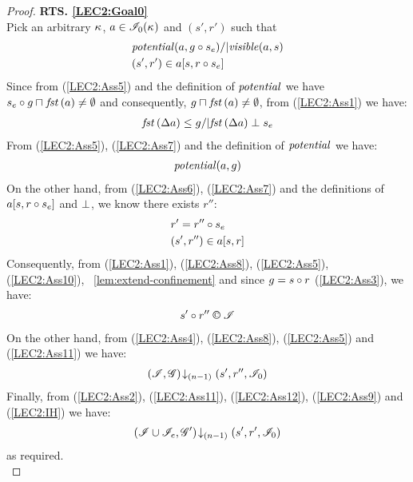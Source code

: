 \begin{lemma}
\begin{proof}
\noindent\textbf{RTS. \ref{LEC2:Goal0}}\\
Pick an arbitrary $\kappa_{}$, $a \in \mathscr{I}_0(\kappa_{})$ and $(s', r')$ such that
%
\begin{align}
	& \mathit{potential}(a, g \circ s_e) /| \mathit{visible}(a, s) \label{LEC2:Ass5}\\
	& (s', r') \in a[s, r \circ s_e] \label{LEC2:Ass6}
\end{align}
Since from (\ref{LEC2:Ass5}) and the definition of $\mathit{potential}$ we have $s_e \circ g \sqcap_{} \mathit{fst}\left(a\right) \not= \emptyset$ and consequently, $g \sqcap_{} \mathit{fst}\left(a\right) \not= \emptyset$, from (\ref{LEC2:Ass1}) we have:
%
\begin{align}
	\mathit{fst}\left(\Delta {a}\right) \leq g /| \mathit{fst}\left(\Delta {a}\right) \mathrel{\bot} s_e \label{LEC2:Ass7}
\end{align}
% 
From (\ref{LEC2:Ass5}), (\ref{LEC2:Ass7}) and the definition of $\mathit{potential}$ we have:
%
\begin{align}
	\mathit{potential}(a, g) \label{LEC2:Ass8}
\end{align}
%
On the other hand, from (\ref{LEC2:Ass6}), (\ref{LEC2:Ass7}) and the definitions of $a[s, r \circ s_e]$ and $\mathrel{\bot}$, we know there exists $r''$: 
%
\begin{align}
	& r' = r'' \circ s_e \label{LEC2:Ass9}\\
	& (s', r'') \in a[s, r]  \label{LEC2:Ass10}
\end{align}
%
Consequently, from (\ref{LEC2:Ass1}), (\ref{LEC2:Ass8}), (\ref{LEC2:Ass5}), (\ref{LEC2:Ass10}), \lem~\ref{lem:extend-confinement} and since $g = s \circ r$ (\ref{LEC2:Ass3}), we have:
%
\begin{align}
	s' \composeL r'' \confines \lmod  \label{LEC2:Ass11}
\end{align}
On the other hand, from (\ref{LEC2:Ass4}), (\ref{LEC2:Ass8}), (\ref{LEC2:Ass5}) and (\ref{LEC2:Ass11}) we have:
%
\begin{align}
	\left(\mathscr{I}, \mathscr{G}\right) \!\downarrow_{(n-1)} \left(s', r'', \mathscr{I}_0\right) \label{LEC2:Ass12}
\end{align}
%
Finally, from (\ref{LEC2:Ass2}), (\ref{LEC2:Ass11}), (\ref{LEC2:Ass12}), (\ref{LEC2:Ass9}) and (\ref{LEC2:IH}) we have:
%
\begin{align*}
	\left(\mathscr{I} \cup \mathscr{I}_{e}, \mathscr{G}'\right) \!\downarrow_{(n-1)} \left(s', r', \mathscr{I}_0\right)
\end{align*}
%
as required.\\
%
%
%


\end{proof}
\end{lemma}
